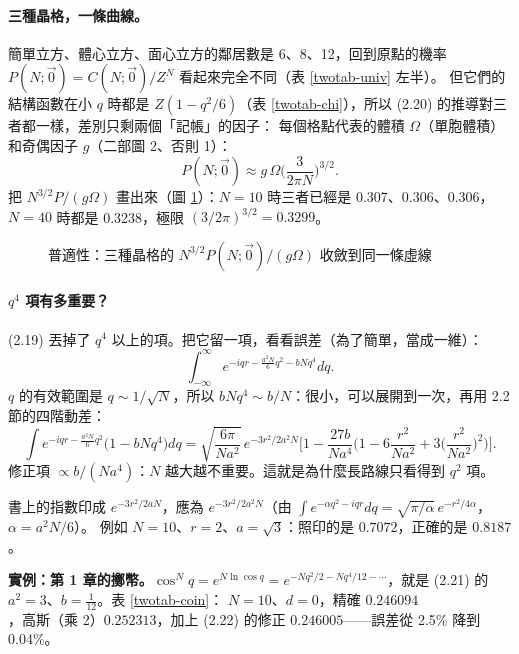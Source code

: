 \paragraph{三種晶格，一條曲線。}
簡單立方、體心立方、面心立方的鄰居數是 6、8、12，回到原點的機率 $P(N;\vec0)=C(N;\vec0)/Z^N$ 看起來完全不同（表 \ref{twotab-univ} 左半）。
但它們的結構函數在小 $q$ 時都是 $Z(1-q^2/6)$（表 \ref{twotab-chi}），所以 (2.20) 的推導對三者都一樣，差別只剩兩個「記帳」的因子：
每個格點代表的體積 $\Omega$（單胞體積）和奇偶因子 $g$（二部圖 2、否則 1）：
\[P(N;\vec0)\approx g\,\Omega\Big(\frac{3}{2\pi N}\Big)^{3/2}.\]
把 $N^{3/2}P/(g\Omega)$ 畫出來（圖 \ref{twofig-univ}）：$N=10$ 時三者已經是 0.307、0.306、0.306，$N=40$ 時都是 0.3238，極限 $(3/2\pi)^{3/2}=0.3299$。
\begin{table}[H]
\centering
\caption{三種立方晶格回到原點的機率；除以 $g\Omega$ 再乘 $N^{3/2}$ 後幾乎一樣}\label{twotab-univ}
\TwoTabUniv
\end{table}
\begin{figure}[H]
\centering
\TwoFigUniv
\caption{普適性：三種晶格的 $N^{3/2}P(N;\vec0)/(g\Omega)$ 收斂到同一條虛線}\label{twofig-univ}
\end{figure}

\paragraph{$q^4$ 項有多重要？}
(2.19) 丟掉了 $q^4$ 以上的項。把它留一項，看看誤差（為了簡單，當成一維）：
\[\int_{-\infty}^\infty e^{-iqr-\frac{a^2N}{6}q^2-bNq^4}dq.\tag{2.21}\]
$q$ 的有效範圍是 $q\sim1/\sqrt N$，所以 $bNq^4\sim b/N$：很小，可以展開到一次，再用 2.2 節的四階動差：
\[\int e^{-iqr-\frac{a^2N}6q^2}\big(1-bNq^4\big)dq=\sqrt{\frac{6\pi}{Na^2}}\,e^{-3r^2/2a^2N}\Big[1-\frac{27b}{Na^4}\Big(1-6\frac{r^2}{Na^2}+3\Big(\frac{r^2}{Na^2}\Big)^2\Big)\Big].\tag{2.22}\]
修正項 $\propto b/(Na^4)$：$N$ 越大越不重要。這就是為什麼長路線只看得到 $q^2$ 項。
\begin{errbox}[p.~35，(2.22)]
書上的指數印成 $e^{-3r^2/2aN}$，應為 $e^{-3r^2/2a^2N}$（由 $\int e^{-\alpha q^2-iqr}dq=\sqrt{\pi/\alpha}\,e^{-r^2/4\alpha}$，$\alpha=a^2N/6$）。
例如 $N=10$、$r=2$、$a=\sqrt3$：照印的是 $0.7072$，正確的是 $0.8187$。
\end{errbox}
\textbf{實例：第 1 章的擲幣。}$\cos^Nq=e^{N\ln\cos q}=e^{-Nq^2/2-Nq^4/12-\cdots}$，就是 (2.21) 的 $a^2=3$、$b=\frac1{12}$。表 \ref{twotab-coin}：
$N=10$、$d=0$，精確 $0.246094$，高斯（乘 2）$0.252313$，加上 (2.22) 的修正 $0.246005$——誤差從 2.5\% 降到 0.04\%。
\begin{table}[H]
\centering
\caption{一維擲幣 $P(N,d)$：高斯近似與加上 $q^4$ 修正 (2.22) 後的值}\label{twotab-coin}
\TwoTabCoin
\end{table}

